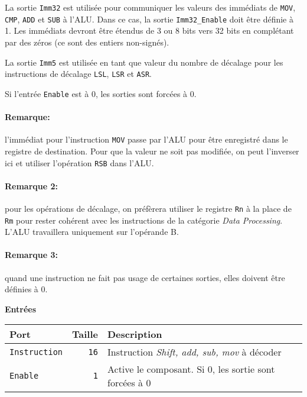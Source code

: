 \documentclass{article}
\begin{document}
    La sortie \texttt{Imm32} est utilisée pour communiquer les valeurs des immédiats de \texttt{MOV}, \texttt{CMP}, \texttt{ADD} et \texttt{SUB} à l'ALU. Dans ce cas, la sortie \texttt{Imm32\_Enable} doit être définie à 1.
    Les immédiats devront être étendus de 3 ou 8 bits vers 32 bits en complétant par des zéros (ce sont des entiers non-signés).

    La sortie \texttt{Imm5} est utilisée en tant que valeur du nombre de décalage pour les instructions de décalage \texttt{LSL}, \texttt{LSR} et \texttt{ASR}.

    Si l'entrée \texttt{Enable} est à 0, les sorties sont forcées à 0.

    \paragraph{Remarque:} l'immédiat pour l'instruction \texttt{MOV} passe par l'ALU pour être enregistré dans le registre de destination.
    Pour que la valeur ne soit pas modifiée, on peut l'inverser ici et utiliser l'opération \texttt{RSB} dans l'ALU.

    \paragraph{Remarque 2:} pour les opérations de décalage, on préfèrera utiliser le registre \texttt{Rn} à la place de \texttt{Rm} pour rester cohérent avec les instructions de la catégorie \textit{Data Processing}.
    L'ALU travaillera uniquement sur l'opérande B.

    \paragraph{Remarque 3:} quand une instruction ne fait pas usage de certaines sorties, elles doivent être définies à 0.



    \textbf{Entrées}\\

    \begin{tabular}{|l|r|l|}
        \hline
        \textbf{Port}       & \textbf{Taille} & \textbf{Description}                                   \\
        \hline

        \texttt{Instruction} & \texttt{16}     & Instruction \textit{Shift, add, sub, mov} à décoder    \\
        \hline
        \texttt{Enable}     & \texttt{1}      & Active le composant.
        Si 0, les sortie sont forcées à 0 \\


        \hline
    \end{tabular}
\end{document}
